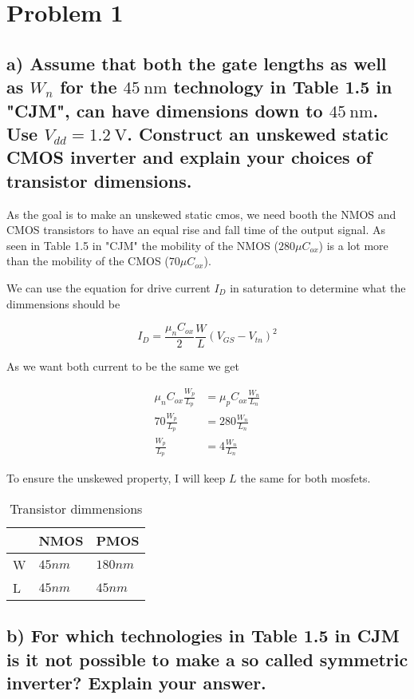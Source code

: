 \section{Problem 1}
\subsection*{a) Assume that both the gate lengths as well as $W_n$ for the $45 \mathrm{~nm}$ technology in Table 1.5 in "CJM", can have dimensions down to $45 \mathrm{~nm}$. Use $V_{d d}=1.2 \mathrm{~V}$. Construct an unskewed static CMOS inverter and explain your choices of 
transistor dimensions.}


As the goal is to make an unskewed static cmos, we need booth the NMOS and CMOS transistors to have an equal rise and fall time of the output signal. As seen in Table 1.5 in "CJM" the mobility of the NMOS ($280\mu C_{ox}$) is a lot more than the mobility of the CMOS ($70\mu C_{ox}$).

We can use the equation for drive current $I_D$ in saturation to determine what the dimmensions should be

$$I_D=\frac{\mu_nC_{ox}}{2}\frac{W}{L}\left(V_{GS}-V_{tn}\right)^2$$

As we want both current to be the same we get 

$$
\begin{aligned}
    \mu_{n}C_{ox}\frac{W_p}{L_p}&=\mu_{p}C_{ox}\frac{W_n}{L_n}\\
    70\frac{W_p}{L_p}&=280\frac{W_n}{L_n}\\
    \frac{W_p}{L_p}&=4\frac{W_n}{L_n}
\end{aligned}
$$

To ensure the unskewed property, I will keep $L$ the same for both mosfets. 

\begin{table}[H]
    \centering
    \caption{Transistor dimmensions}
    \begin{tabular}{lll}
\hline
& NMOS & PMOS \\
\hline
W& $45nm$ & $180nm$ \\
L& $45nm$ &$45nm$ \\
\hline
    \end{tabular}
    \end{table}

\subsection*{b) For which technologies in Table 1.5 in CJM is it not possible to make a so called symmetric inverter? Explain your answer.}

